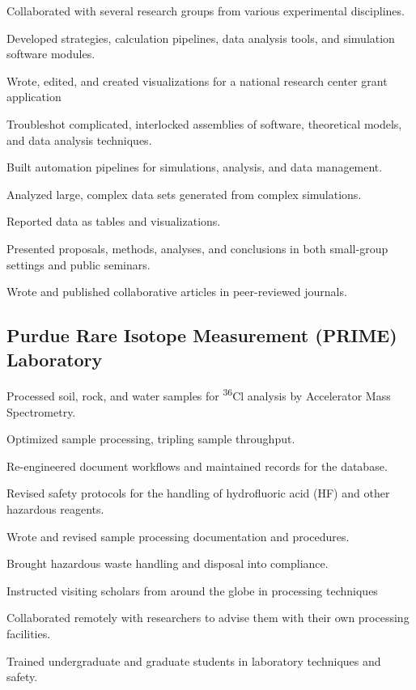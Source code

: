 \documentclass[letterpaper]{deedy-resume} %
\begin{document}
\begin{minipage}[t]{0.65\textwidth}
\begin{tightitemize}
\item Collaborated with several research groups from various experimental disciplines. 
\item Developed strategies, calculation pipelines, data analysis tools, and simulation software modules. 
\item Wrote, edited, and created visualizations for a national research center grant application
\item Troubleshot complicated, interlocked assemblies of software, theoretical models, and data analysis techniques.
\item Built automation pipelines for simulations, analysis, and data management.
\item Analyzed large, complex data sets generated from complex simulations.
\item Reported data as tables and visualizations.
\item Presented proposals, methods, analyses, and conclusions in both small-group settings and public seminars.
\item Wrote and published collaborative articles in peer-reviewed journals.
\end{tightitemize}
\sectionspace %

\subsection{Purdue Rare Isotope Measurement (PRIME) Laboratory}
\begin{tightitemize}
\item Processed soil, rock, and water samples for \textsuperscript{36}Cl analysis by Accelerator Mass Spectrometry.
\item Optimized sample processing, tripling sample throughput.
\item Re-engineered document workflows and maintained records for the database.
\item Revised safety protocols for the handling of hydrofluoric acid (HF) and other hazardous reagents.
\item Wrote and revised sample processing documentation and procedures.
\item Brought hazardous waste handling and disposal into compliance.
\item Instructed visiting scholars from around the globe in processing techniques
\item Collaborated remotely with researchers to advise them with their own processing facilities.
\item Trained undergraduate and graduate students in laboratory techniques and safety.
\end{tightitemize}
\end{minipage} %
\end{document}
